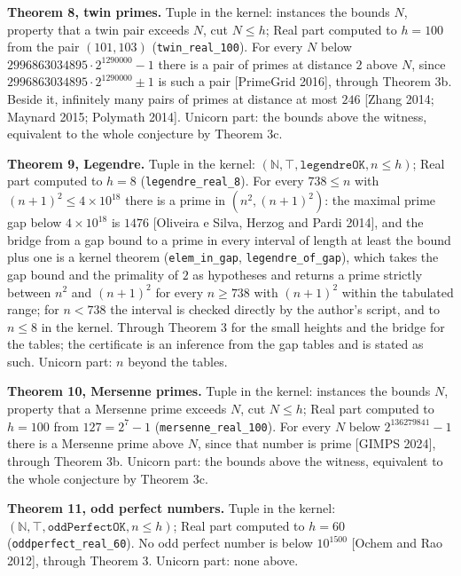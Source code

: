 \documentclass[10pt]{article}
\begin{document}
\textbf{Theorem 8, twin primes.} Tuple in the kernel: instances the
bounds \(N\), property that a twin pair exceeds \(N\), cut \(N \le h\);
Real part computed to \(h = 100\) from the pair \((101, 103)\)
(\texttt{twin\_real\_100}). For every \(N\) below
\(2996863034895 \cdot 2^{1290000} - 1\) there is a pair of primes at
distance \(2\) above \(N\), since
\(2996863034895 \cdot 2^{1290000} \pm 1\) is such a pair {[}PrimeGrid
2016{]}, through Theorem 3b. Beside it, infinitely many pairs of primes
at distance at most \(246\) {[}Zhang 2014; Maynard 2015; Polymath
2014{]}. Unicorn part: the bounds above the witness, equivalent to the
whole conjecture by Theorem 3c.

\textbf{Theorem 9, Legendre.} Tuple in the kernel:
\((\mathbb{N}, \top, \texttt{legendreOK}, n \le h)\); Real part computed
to \(h = 8\) (\texttt{legendre\_real\_8}). For every \(738 \le n\) with
\((n+1)^2 \le 4 \times 10^{18}\) there is a prime in \((n^2, (n+1)^2)\):
the maximal prime gap below \(4 \times 10^{18}\) is \(1476\) {[}Oliveira
e Silva, Herzog and Pardi 2014{]}, and the bridge from a gap bound to a
prime in every interval of length at least the bound plus one is a
kernel theorem (\texttt{elem\_in\_gap}, \texttt{legendre\_of\_gap}),
which takes the gap bound and the primality of \(2\) as hypotheses and
returns a prime strictly between \(n^2\) and \((n+1)^2\) for every
\(n \ge 738\) with \((n+1)^2\) within the tabulated range; for
\(n < 738\) the interval is checked directly by the author's script, and
to \(n \le 8\) in the kernel. Through Theorem 3 for the small heights
and the bridge for the tables; the certificate is an inference from the
gap tables and is stated as such. Unicorn part: \(n\) beyond the tables.

\textbf{Theorem 10, Mersenne primes.} Tuple in the kernel: instances the
bounds \(N\), property that a Mersenne prime exceeds \(N\), cut
\(N \le h\); Real part computed to \(h = 100\) from \(127 = 2^7 - 1\)
(\texttt{mersenne\_real\_100}). For every \(N\) below
\(2^{136279841} - 1\) there is a Mersenne prime above \(N\), since that
number is prime {[}GIMPS 2024{]}, through Theorem 3b. Unicorn part: the
bounds above the witness, equivalent to the whole conjecture by Theorem
3c.

\textbf{Theorem 11, odd perfect numbers.} Tuple in the kernel:
\((\mathbb{N}, \top, \texttt{oddPerfectOK}, n \le h)\); Real part
computed to \(h = 60\) (\texttt{oddperfect\_real\_60}). No odd perfect
number is below \(10^{1500}\) {[}Ochem and Rao 2012{]}, through Theorem
3. Unicorn part: none above.
\end{document}
